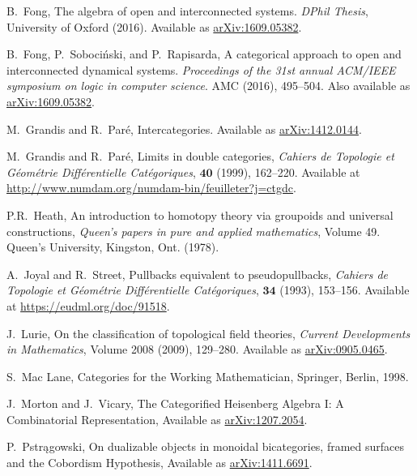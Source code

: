 \documentclass[11pt]{amsart}
\theoremstyle{remark}
\theoremstyle{definition}
\begin{document}
\begin{thebibliography}{100}
B.~Fong,
The algebra of open and interconnected systems.
\emph{DPhil Thesis},
University of Oxford (2016).
Available as \href{https://arxiv.org/abs/1609.05382}{arXiv:1609.05382}.

B.~Fong, P.~Soboci\'{n}ski, and P.~Rapisarda,
A categorical approach to open and interconnected dynamical systems.
\emph{Proceedings of the 31st annual ACM/IEEE symposium on logic in computer science}.
AMC (2016), 495--504.
Also available as \href{https://arxiv.org/abs/1609.05382}{arXiv:1609.05382}.

M.~Grandis and R.~Par\'{e}, 
Intercategories.
Available as \href{https://arxiv.org/abs/1412.0144}{arXiv:1412.0144}.

M.~Grandis and R.~Par\'{e}, 
Limits in double categories, 
\emph{Cahiers de Topologie et G\'{e}om\'{e}trie Diff\'{e}rentielle Cat\'{e}goriques}, $\mathbf{40}$  
(1999), 162--220. 
Available at \href{http://www.numdam.org/numdam-bin/feuilleter?j=ctgdc}{http://www.numdam.org/numdam-bin/feuilleter?j=ctgdc}.

P.R.\ Heath,
An introduction to homotopy theory via groupoids and universal constructions,
\emph{Queen’s papers in pure and applied mathematics}, Volume 49.
Queen’s University,  Kingston, Ont. (1978).

A.\ Joyal and R.\ Street,
Pullbacks equivalent to pseudopullbacks,
\emph{Cahiers de Topologie et G\'{e}om\'{e}trie Diff\'{e}rentielle Cat\'{e}goriques}, $\mathbf{34}$
(1993), 153--156.
Available at \href{https://eudml.org/doc/91518}{https://eudml.org/doc/91518}.

J.~Lurie,
On the classification of topological field theories,
\emph{Current Developments in Mathematics},
Volume 2008 (2009), 129--280.
Available as \href{https://arxiv.org/abs/0905.0465}{arXiv:0905.0465}.

S.~Mac Lane, 
Categories for the Working Mathematician,
Springer, Berlin, 1998.

J.\ Morton and J.\ Vicary,
The Categorified Heisenberg Algebra I: A Combinatorial Representation,
Available as \href{https://arxiv.org/abs/1207.2054}{arXiv:1207.2054}.

P.~Pstrągowski,
On dualizable objects in monoidal bicategories, framed surfaces and the Cobordism Hypothesis, 
Available as \href{https://arxiv.org/abs/1411.6691}{arXiv:1411.6691}.


\end{thebibliography}
\end{document}
